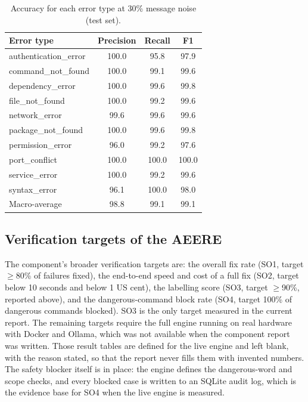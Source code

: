 \begin{table}[htbp]
  \centering
  \begin{tabular}{@{}lccc@{}}
    \toprule
    \textbf{Error type} & \textbf{Precision} & \textbf{Recall} & \textbf{F1}\\
    \midrule
    authentication\_error & 100.0 & 95.8 & 97.9\\
    command\_not\_found & 100.0 & 99.1 & 99.6\\
    dependency\_error & 100.0 & 99.6 & 99.8\\
    file\_not\_found & 100.0 & 99.2 & 99.6\\
    network\_error & 99.6 & 99.6 & 99.6\\
    package\_not\_found & 100.0 & 99.6 & 99.8\\
    permission\_error & 96.0 & 99.2 & 97.6\\
    port\_conflict & 100.0 & 100.0 & 100.0\\
    service\_error & 100.0 & 99.2 & 99.6\\
    syntax\_error & 96.1 & 100.0 & 98.0\\
    \midrule
    Macro-average & 98.8 & 99.1 & 99.1\\
    \bottomrule
  \end{tabular}
  \caption{Accuracy for each error type at 30\% message noise (test set).}\label{tab:aeere-pertype}
\end{table}

\subsection{Verification targets of the AEERE}\label{sec:results-aeere-targets}

The component's broader verification targets are: the overall fix rate (SO1,
target \(\geq \)80\% of failures fixed), the end-to-end speed and cost of a full
fix (SO2, target below 10 seconds and below 1 US cent), the labelling score
(SO3, target \(\geq \)90\%, reported above), and the dangerous-command block
rate (SO4, target 100\% of dangerous commands blocked). SO3 is the only target
measured in the current report. The remaining targets require the full engine
running on real hardware with Docker and Ollama, which was not available when
the component report was written. Those result tables are defined for the live
engine and left blank, with the reason stated, so that the report never fills
them with invented numbers. The safety blocker itself is in place: the engine
defines the dangerous-word and scope checks, and every blocked case is written
to an SQLite audit log, which is the evidence base for SO4 when the live engine
is measured.

